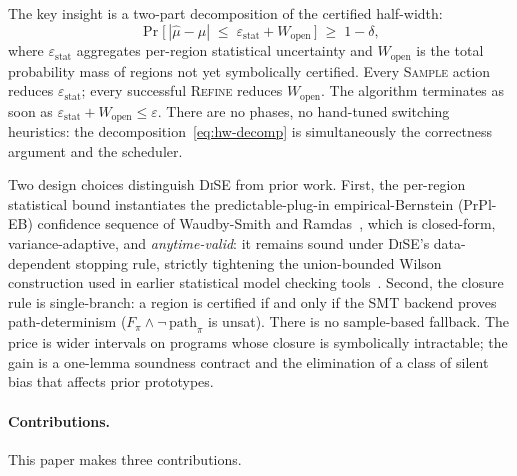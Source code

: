 \documentclass[runningheads]{llncs}
\newcommand{\mutrue}{\mu}
\newcommand{\muhat}{\hat{\mu}}
\newcommand{\Wopen}{W_{\mathrm{open}}}
\newcommand{\epsstat}{\varepsilon_{\mathrm{stat}}}
\newcommand{\unsat}{\textsf{unsat}}
\newcommand{\toolname}{\textsc{DiSE}}
\begin{document}
The key insight is a two-part decomposition of the certified
half-width:
\begin{equation}\label{eq:hw-decomp}
  \Pr\!\big[\,|\muhat - \mutrue| \;\le\; \epsstat + \Wopen\,\big]
  \;\ge\; 1 - \delta,
\end{equation}
where $\epsstat$ aggregates per-region statistical uncertainty and
$\Wopen$ is the total probability mass of regions not yet
symbolically certified.  Every \textsc{Sample} action reduces
$\epsstat$; every successful \textsc{Refine} reduces $\Wopen$.  The
algorithm terminates as soon as $\epsstat + \Wopen \le \varepsilon$.
There are no phases, no hand-tuned switching heuristics: the
decomposition~\eqref{eq:hw-decomp} is simultaneously the correctness
argument and the scheduler.

Two design choices distinguish \toolname{} from prior work.  First,
the per-region statistical bound instantiates the predictable-plug-in
empirical-Bernstein (PrPl-EB) confidence sequence of Waudby-Smith and
Ramdas~\cite{waudbysmith2024betting}, which is closed-form,
variance-adaptive, and \emph{anytime-valid}: it remains sound under
\toolname{}'s data-dependent stopping rule, strictly tightening the
union-bounded Wilson construction used in earlier statistical model
checking
tools~\cite{boyer2013plasma,hartmanns2014modest}.  Second, the
closure rule is single-branch: a region is certified if and only if
the SMT backend proves path-determinism ($F_\pi \wedge
\neg\,\text{path}_\pi$ is \unsat{}).  There is no sample-based
fallback.  The price is wider intervals on programs whose closure is
symbolically intractable; the gain is a one-lemma soundness contract
and the elimination of a class of silent bias that affects prior
prototypes.

\paragraph{Contributions.}
This paper makes three contributions.
\end{document}
